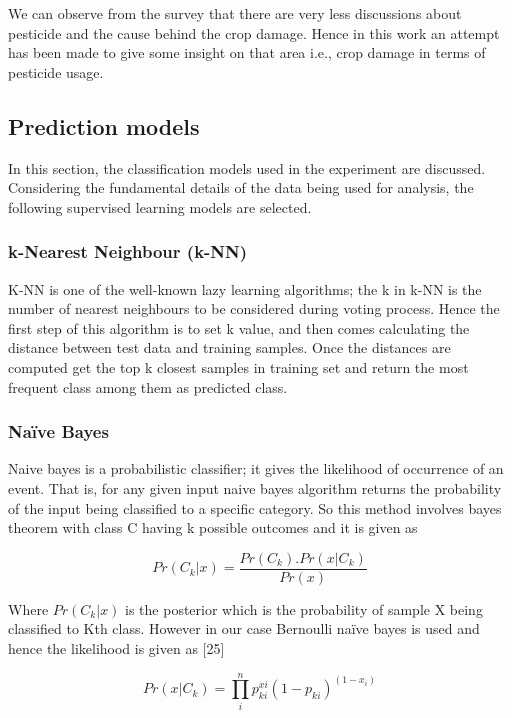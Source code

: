 \documentclass[12pt]{article}
\begin{document}
We can observe from the survey that there are very less discussions about pesticide and the cause behind the crop damage. Hence in this work an attempt has been made to give some insight on that area i.e., crop damage in terms of pesticide usage.


	\subsection{Prediction models}
In this section, the classification models used in the experiment are discussed. Considering the fundamental details of the data being used for analysis, the following supervised learning models are selected.
	
\subsubsection{k-Nearest Neighbour  (k-NN)} 
K-NN is one of the well-known lazy learning algorithms; the k in k-NN is the number of nearest neighbours to be considered during voting process. Hence the first step of this algorithm is to set k value, and then comes calculating the distance between test data and training samples. Once the distances are computed get the top k closest samples in training set and return the most frequent class among them as predicted class.


\subsubsection{Naïve Bayes}
Naive bayes is a probabilistic classifier; it gives the likelihood of occurrence of an event. That is, for any given input naive bayes algorithm returns the probability of the input being classified to a specific category. So this method involves bayes theorem with class C having k possible outcomes and it is given as

\begin{equation} 
 Pr(C_k | x)= \frac{Pr(C_k).Pr(x|C_k)}{Pr(x)}                       
\end{equation}

Where $Pr(C_k|x)$ is the posterior which is the probability of sample X being classified to Kth class. However in our case Bernoulli naïve bayes is used and hence the likelihood is given as [25]

\begin{equation} 
 Pr(x | C_k)= \prod_i^n p_{ki}^{xi}(1- p_{ki})^{(1-x_i)}                 
\end{equation}
\end{document}
